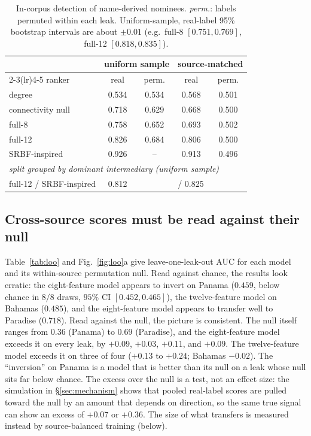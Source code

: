 \documentclass[11pt]{article}
\begin{document}
\begin{table}[t]\centering\small\setlength{\tabcolsep}{3.5pt}
\begin{tabular}{lcccc}
\toprule
& \multicolumn{2}{c}{uniform sample} & \multicolumn{2}{c}{source-matched}\\
\cmidrule(lr){2-3}\cmidrule(lr){4-5}
ranker & real & perm. & real & perm.\\
\midrule
degree & 0.534 & 0.534 & 0.568 & 0.501\\
connectivity null & 0.718 & 0.629 & 0.668 & 0.500\\
full-8 & 0.758 & 0.652 & 0.693 & 0.502\\
full-12 & 0.826 & 0.684 & 0.806 & 0.500\\
SRBF-inspired & 0.926 & -- & 0.913 & 0.496\\
\midrule
\multicolumn{5}{l}{\emph{split grouped by dominant intermediary (uniform sample)}}\\
full-12 / SRBF-inspired & 0.812 & & \multicolumn{2}{l}{/ 0.825}\\
\bottomrule
\end{tabular}
\caption{In-corpus detection of name-derived nominees. \emph{perm.}: labels
permuted within each leak. Uniform-sample, real-label 95\% bootstrap intervals are
about $\pm0.01$ (e.g.\ full-8 $[0.751, 0.769]$, full-12 $[0.818, 0.835]$).}
\label{tab:incorpus}\end{table}

\subsection{Cross-source scores must be read against their null}\label{sec:res-loo}
Table~\ref{tab:loo} and Fig.~\ref{fig:loo}a give leave-one-leak-out AUC for each
model and its within-source permutation null. Read against chance, the results
look erratic: the eight-feature model appears to invert on Panama ($0.459$, below
chance in $8/8$ draws, $95\%$ CI $[0.452, 0.465]$), the twelve-feature model on
Bahamas ($0.485$), and the eight-feature model appears to transfer well to
Paradise ($0.718$). Read against the null, the picture is consistent. The null
itself ranges from $0.36$ (Panama) to $0.69$ (Paradise), and the eight-feature
model exceeds it on every leak, by $+0.09$, $+0.03$, $+0.11$, and $+0.09$. The
twelve-feature model exceeds it on three of four ($+0.13$ to $+0.24$; Bahamas
$-0.02$). The ``inversion'' on Panama is a model that is better than its null on a
leak whose null sits far below chance. The excess over the null is a test, not an
effect size: the simulation in \S\ref{sec:mechanism} shows that pooled real-label
scores are pulled toward the null by an amount that depends on direction, so the
same true signal can show an excess of $+0.07$ or $+0.36$. The size of what
transfers is measured instead by source-balanced training (below).
\end{document}
